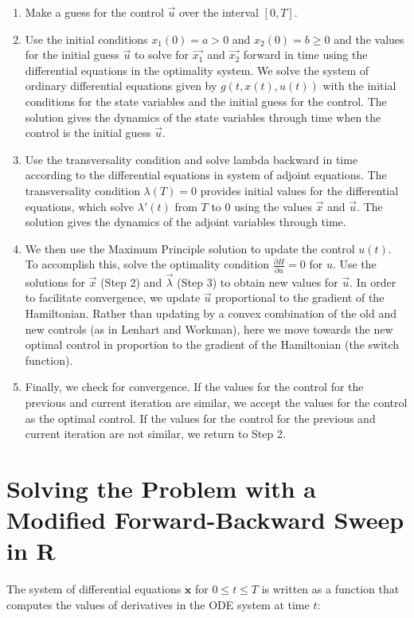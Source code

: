 \documentclass[12pt, oneside]{article}   	%
\begin{document}
\begin{enumerate}
\item Make a guess for the control $\vec{u}$ over the interval $[0,T]$.
\item Use the initial conditions $x_1(0) = a > 0$ and $x_2(0) = b \geq 0$ and the values for the initial guess $\vec{u}$ to solve for $\vec{x_1}$ and $\vec{x_2}$ forward in time using the differential equations in the optimality system. We solve the system of ordinary differential equations given by $g(t,x(t),u(t))$ with the initial conditions for the state variables and the initial guess for the control. The solution gives the dynamics of the state variables through time when the control is the initial guess $\vec{u}$.
\item Use the transversality condition and solve lambda backward in time according to the differential equations in system of adjoint equations. The transversality condition $\lambda(T) = 0$ provides initial values for the differential equations, which solve $\lambda'(t)$ from $T$ to $0$ using the values $\vec{x}$ and $\vec{u}$. The solution gives the dynamics of the adjoint variables through time.
\item We then use the Maximum Principle solution to update the control $u(t)$. To accomplish this, solve the optimality condition $\frac{\partial H}{\partial u} = 0$ for $u$. Use the solutions for $\vec{x}$ (Step 2) and $\vec{\lambda}$ (Step 3) to obtain new values for $\vec{u}$. In order to facilitate convergence, we update $\vec{u}$ proportional to the gradient of the Hamiltonian. Rather than updating by a convex combination of the old and new controls (as in Lenhart and Workman), here we move towards the new optimal control in proportion to the gradient of the Hamiltonian (the switch function).
\item Finally, we check for convergence. If the values for the control for the previous and current iteration are similar, we accept the values for the control as the optimal control. If the values for the control for the previous and current iteration are not similar, we return to Step 2.
\end{enumerate}

\section*{Solving the Problem with a Modified Forward-Backward Sweep in R}

\noindent The system of differential equations $\dot{\bm{x}}$ for $0\leq t \leq T$ is written as a function that computes the values of derivatives in the ODE system at time $t$:
\end{document}

